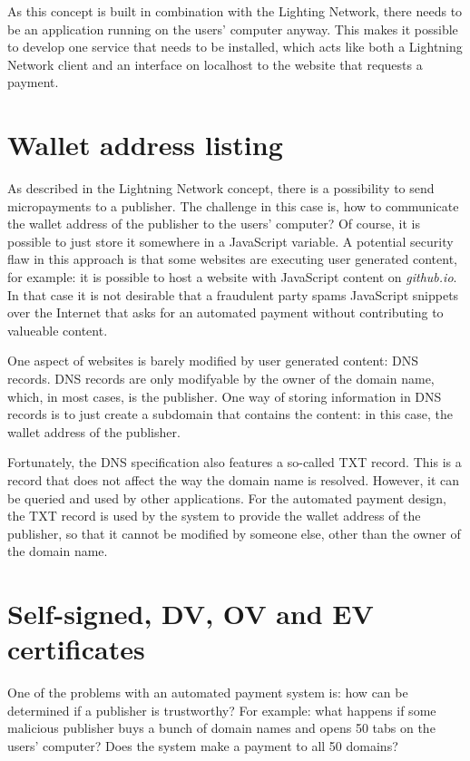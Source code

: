 As this concept is built in combination with the Lighting Network, there needs to be an application running on the users' computer anyway. This makes it possible to develop one service that needs to be installed, which acts like both a Lightning Network client and an interface on localhost to the website that requests a payment.


\section{Wallet address listing}

As described in the Lightning Network concept, there is a possibility to send micropayments to a publisher. The challenge in this case is, how to communicate the wallet address of the publisher to the users' computer? Of course, it is possible to just store it somewhere in a JavaScript variable. A potential security flaw in this approach is that some websites are executing user generated content, for example: it is possible to host a website with JavaScript content on \textit{github.io}. In that case it is not desirable that a fraudulent party spams JavaScript snippets over the Internet that asks for an automated payment without contributing to valueable content. 

One aspect of websites is barely modified by user generated content: DNS records. DNS records are only modifyable by the owner of the domain name, which, in most cases, is the publisher. One way of storing information in DNS records is to just create a subdomain that contains the content: in this case, the wallet address of the publisher. 

Fortunately, the DNS specification also features a so-called TXT record. This is a record that does not affect the way the domain name is resolved. However, it can be queried and used by other applications. For the automated payment design, the TXT record is used by the system to provide the wallet address of the publisher, so that it cannot be modified by someone else, other than the owner of the domain name. 

\section{Self-signed, DV, OV and EV certificates}

One of the problems with an automated payment system is: how can be determined if a publisher is trustworthy? For example: what happens if some malicious publisher buys a bunch of domain names and opens 50 tabs on the users' computer? Does the system make a payment to all 50 domains? 

